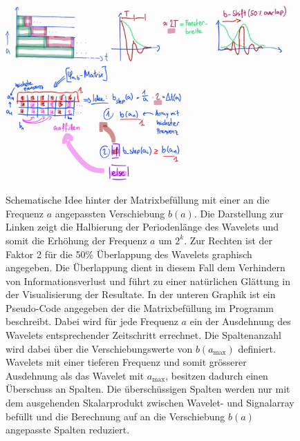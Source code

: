 \begin{figure}
	\centering
	\includegraphics[width=0.35\textwidth]{papers/wavelets/images/16-1_filterbankFillUp_1.png}
	\includegraphics[width=0.6\textwidth]{papers/wavelets/images/16-2_filterbankFillUp_2.png}
	\includegraphics[width=0.6\textwidth]{papers/wavelets/images/16-3_filterbankFillUp_3.png}
	\caption{Schematische Idee hinter der Matrixbefüllung mit einer an die Frequenz $a$ angepassten Verschiebung $b(a)$. Die Darstellung zur Linken zeigt die Halbierung der Periodenlänge des Wavelets und somit die Erhöhung der Frequenz $a$ um $2^k$. Zur Rechten ist der Faktor 2 für die 50\% Überlappung des Wavelets graphisch angegeben. Die Überlappung dient in diesem Fall dem Verhindern von Informationsverlust und führt zu einer natürlichen Glättung in der Visualisierung der Resultate. In der unteren Graphik ist ein Pseudo-Code angegeben der die Matrixbefüllung im Programm beschreibt. Dabei wird für jede Frequenz $a$ ein der Ausdehnung des Wavelets entsprechender Zeitschritt errechnet. Die Spaltenanzahl wird dabei über die Verschiebungswerte von $b(a_\text{max})$ definiert. 
	Wavelets mit einer tieferen Frequenz und somit grösserer Ausdehnung als das Wavelet mit $a_\text{max}$, besitzen dadurch einen Überschuss an Spalten. Die überschüssigen Spalten werden nur mit dem ausgehenden Skalarprodukt zwischen Wavelet- und Signalarray befüllt und die Berechnung auf an die Verschiebung $b(a)$ angepasste Spalten reduziert.}
	\label{wavelet:fig:filterbankFillUp}
\end{figure}

